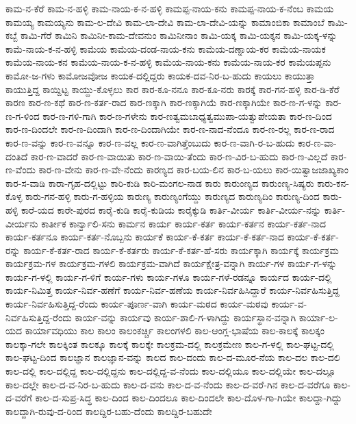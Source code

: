 ಕಾಮ-ನ-ಕೆರೆ
ಕಾಮ-ನ-ಹಳ್ಳಿ
ಕಾಮ-ನಾಯ-ಕ-ನ-ಹಳ್ಳಿ
ಕಾಮಪ್ಪ-ನಾಯ-ಕನು
ಕಾಮಪ್ಪ-ನಾಯ-ಕ-ನೆಂಬ
ಕಾಮಯ
ಕಾಮಯ್ಯ
ಕಾಮಯ್ಯನು
ಕಾಮ-ಲ-ದೇವಿ
ಕಾಮ-ಲಾ-ದೇವಿ
ಕಾಮ-ಲಾ-ದೇವಿ-ಯನ್ನು
ಕಾಮಾಂಬಿಕಾ
ಕಾಮಾಂಬೆ
ಕಾಮಿ-ಕಬ್ಬೆ
ಕಾಮಿ-ಗೆರೆ
ಕಾಮಿನಿ
ಕಾಮಿನೀ-ಕಾಮ-ದೇವನುಂ
ಕಾಮಿನೀನಾಂ
ಕಾಮಿ-ಯಕ್ಕ
ಕಾಮಿ-ಯಕ್ಕನ
ಕಾಮಿ-ಯಕ್ಕ-ಳನ್ನು
ಕಾಮೆ-ನಾಯ-ಕ-ನ-ಹಳ್ಳಿ
ಕಾಮೆಯ
ಕಾಮೆಯ-ದಂಡ-ನಾಯ-ಕನು
ಕಾಮೆಯ-ದಣ್ನಾಯ-ಕರ
ಕಾಮೆಯ-ನಾಯಕ
ಕಾಮೆಯ-ನಾಯ-ಕನ
ಕಾಮೆಯ-ನಾಯ-ಕ-ನ-ಹಳ್ಳಿ
ಕಾಮೆಯ-ನಾಯ-ಕನು
ಕಾಮೆಯ-ನಾಯ-ಕರ
ಕಾಮೆಯಪ್ಪನು
ಕಾಮೋ-ಜ-ಗಳು
ಕಾಮೋಜವೋಜ
ಕಾಯಕ-ದಲ್ಲಿದ್ದರು
ಕಾಯಕ-ದವ-ನಿರ-ಬ-ಹುದು
ಕಾಯಲು
ಕಾಯುತ್ತಾ
ಕಾಯುತ್ತಿದ್ದ
ಕಾಯ್ದಿಟ್ಟ
ಕಾಯ್ದು-ಕೊಳ್ಳಲು
ಕಾರ
ಕಾರ-ಕೂ-ನನೂ
ಕಾರ-ಕೂ-ನರು
ಕಾರಕ್ಕೆ
ಕಾರ-ಗನ-ಹಳ್ಳಿ
ಕಾರ-ಡಿ-ಕೆರೆ
ಕಾರಣ
ಕಾರ-ಣ-ಕಥೆ
ಕಾರ-ಣ-ಕರ್ತ-ರಾದ
ಕಾರ-ಣಕ್ಕಾಗಿ
ಕಾರ-ಣಕ್ಕಾಗಿಯೆ
ಕಾರ-ಣಕ್ಕಾಗಿಯೇ
ಕಾರ-ಣ-ಗ-ಳನ್ನು
ಕಾರ-ಣ-ಗ-ಳಿಂದ
ಕಾರ-ಣ-ಗಳಿ-ಗಾಗಿ
ಕಾರ-ಣ-ಗಳೇನು
ಕಾರ-ಣತ್ವಮಬಾಧ್ಯತ್ವಮುಪಾ-ಯತ್ವುಪೇಯತಾ
ಕಾರ-ಣ-ದಿಂದ
ಕಾರ-ಣ-ದಿಂದಲೇ
ಕಾರ-ಣ-ದಿಂದಾಗಿ
ಕಾರ-ಣ-ದಿಂದಾಗಿಯೇ
ಕಾರ-ಣ-ನಾದ-ನೆಂದೂ
ಕಾರ-ಣ-ರಲ್ಲ
ಕಾರ-ಣ-ರಾದ
ಕಾರ-ಣ-ವನ್ನು
ಕಾರ-ಣ-ವನ್ನೂ
ಕಾರ-ಣ-ವಲ್ಲ
ಕಾರ-ಣ-ವಾಗಿತ್ತೆಂಬುದು
ಕಾರ-ಣ-ವಾಗಿ-ರ-ಬ-ಹುದು
ಕಾರ-ಣ-ವಾ-ದಂತಿದೆ
ಕಾರ-ಣ-ವಾದರೆ
ಕಾರ-ಣ-ವಾಯಿತು
ಕಾರ-ಣ-ವಾಯಿ-ತೆಂದು
ಕಾರ-ಣ-ವಿರ-ಬ-ಹುದು
ಕಾರ-ಣ-ವಿಲ್ಲದೆ
ಕಾರ-ಣ-ವೆಂದು
ಕಾರ-ಣ-ವೇನು
ಕಾರ-ಣ-ವೇ-ನೆಂದು
ಕಾರಣ್ಯದ
ಕಾರ-ಬಯ-ಲಿನ
ಕಾರ-ಬ-ಯಲು
ಕಾರ-ಯಿತ್ವಾಜಜಾಖ್ಯಕಾಂ
ಕಾರ-ಸ-ವಾಡಿ
ಕಾರಾ-ಗೃಹ-ದಲ್ಲಿಟ್ಟು
ಕಾರಿ-ಕುಡಿ
ಕಾರಿ-ಮಂಗಲ-ನಾಡ
ಕಾರು
ಕಾರುಂಣ್ಯದ
ಕಾರುಂಣ್ಯ-ಸಿಷ್ಯರು
ಕಾರು-ಕನ-ಕೊಳ್ಳ
ಕಾರು-ಗನ-ಹಳ್ಳಿ
ಕಾರು-ಗ-ಹಳ್ಳಿಯ
ಕಾರುಣ್ಯ
ಕಾರುಣ್ಯಂಗೆಯ್ದು
ಕಾರುಣ್ಯದ
ಕಾರುಣ್ಯದಿಂ
ಕಾರುಣ್ಯ-ದಿಂದ
ಕಾರು-ಹಳ್ಳಿ
ಕಾರೆ-ಯದ
ಕಾರೇ-ಪುರದ
ಕಾರೈ-ಕುಡಿ
ಕಾರೈ-ಕುಡಿಯ
ಕಾರೈಕ್ಕುಡಿ
ಕಾರ್ತಿ-ವೀರ್ಯ
ಕಾರ್ತಿ-ವೀರ್ಯ-ನನ್ನು
ಕಾರ್ತಿ-ವೀರ್ಯನು
ಕಾರ್ತೀಕ
ಕಾರ್ನ್ವಾಲಿ-ಸನು
ಕಾರ್ಮನ
ಕಾರ್ಯ
ಕಾರ್ಯ-ಕರ್ತ
ಕಾರ್ಯ-ಕರ್ತನ
ಕಾರ್ಯ-ಕರ್ತ-ನಾದ
ಕಾರ್ಯ-ಕರ್ತನೂ
ಕಾರ್ಯ-ಕರ್ತ-ನೊಬ್ಬನು
ಕಾರ್ಯಕೆ
ಕಾರ್ಯ-ಕೆ-ಕರ್ತ
ಕಾರ್ಯ-ಕೆ-ಕರ್ತ-ನಾದ
ಕಾರ್ಯ-ಕೆ-ಕರ್ತ-ರನ್ನು
ಕಾರ್ಯ-ಕೆ-ಕರ್ತ-ರಾದ
ಕಾರ್ಯ-ಕೆ-ಕರ್ತರು
ಕಾರ್ಯ-ಕೆ-ಕರ್ತ-ಹೆ-ಸರು
ಕಾರ್ಯಕ್ಕಾಗಿ
ಕಾರ್ಯಕ್ಕೆ
ಕಾರ್ಯಕ್ರಮ
ಕಾರ್ಯಕ್ರಮ-ಗಳ
ಕಾರ್ಯಕ್ರಮ-ಗಳಲಿ
ಕಾರ್ಯಕ್ರಮ-ವಾಗಿದೆ
ಕಾರ್ಯಕ್ಷೇತ್ರ-ವನ್ನಾಗಿ
ಕಾರ್ಯ-ಗಳ
ಕಾರ್ಯ-ಗ-ಳನ್ನು
ಕಾರ್ಯ-ಗ-ಳಲ್ಲಿ
ಕಾರ್ಯ-ಗ-ಳಿಗೆ
ಕಾರ್ಯ-ಗಳು
ಕಾರ್ಯ-ಗಳೂ
ಕಾರ್ಯ-ಗಳೆ-ರಡನ್ನೂ
ಕಾರ್ಯದ
ಕಾರ್ಯ-ದಲ್ಲಿ
ಕಾರ್ಯ-ನಿಮಿತ್ತ
ಕಾರ್ಯ-ನಿರ್ವ-ಹಣೆಗೆ
ಕಾರ್ಯ-ನಿರ್ವ-ಹಣೆಯ
ಕಾರ್ಯ-ನಿರ್ವಹಿಸಿದ್ದಾರೆ
ಕಾರ್ಯ-ನಿರ್ವಹಿಸುತ್ತಿದ್ದ
ಕಾರ್ಯ-ನಿರ್ವಹಿಸುತ್ತಿದ್ದ-ರೆಂದು
ಕಾರ್ಯ-ಪೂರ್ಣ-ವಾಗಿ
ಕಾರ್ಯ-ಮಠದ
ಕಾರ್ಯ-ಮಠವು
ಕಾರ್ಯ-ವ-ನಿರ್ವಹಿಸುತ್ತಿದ್ದ-ರೆಂದು
ಕಾರ್ಯ-ವನ್ನು
ಕಾರ್ಯವು
ಕಾರ್ಯ-ಶಾಲಿ-ಗ-ಳಾಗಿದ್ದು
ಕಾರ್ಯಸ್ಥಾನ-ವನ್ನಾಗಿ
ಕಾರ್ಯಾ-ಲ-ಯದ
ಕಾರ್ಯಾವಧಿಯು
ಕಾಲ
ಕಾಲಂ
ಕಾಲಂಕರ್ಚ್ಚಿ
ಕಾಲಂಗಳಲಿ
ಕಾಲ-ಆಂಗ್ಲ-ಭಾಷೆಯ
ಕಾಲ-ಕಾಲಕ್ಕೆ
ಕಾಲಕ್ಕಂ
ಕಾಲಕ್ಕಾ-ಗಲೇ
ಕಾಲಕ್ಕಿಂತ
ಕಾಲಕ್ಕೂ
ಕಾಲಕ್ಕೆ
ಕಾಲಕ್ಕೇ
ಕಾಲಕ್ರಮ-ದಲ್ಲಿ
ಕಾಲಕ್ರಮೇಣ
ಕಾಲ-ಗ-ಳಲ್ಲಿ
ಕಾಲ-ಘಟ್ಟ-ದಲ್ಲಿ
ಕಾಲ-ಘಟ್ಟ-ದಿಂದ
ಕಾಲಜ್ಞಾನ
ಕಾಲಜ್ಞಾನ-ವನ್ನು
ಕಾಲದ
ಕಾಲ-ದಂದು
ಕಾಲ-ದ-ಮೂರ-ನೆಯ
ಕಾಲ-ದಲ
ಕಾಲ-ದಲಿ
ಕಾಲ-ದಲ್ಲಿ
ಕಾಲ-ದಲ್ಲಿದ್ದ
ಕಾಲ-ದಲ್ಲಿದ್ದನು
ಕಾಲ-ದಲ್ಲಿದ್ದ-ವ-ನೆಂದು
ಕಾಲ-ದಲ್ಲಿಯೂ
ಕಾಲ-ದಲ್ಲಿಯೇ
ಕಾಲ-ದಲ್ಲೂ
ಕಾಲ-ದಲ್ಲೇ
ಕಾಲ-ದ-ವ-ನಿರ-ಬ-ಹುದು
ಕಾಲ-ದ-ವನು
ಕಾಲ-ದ-ವ-ನೆಂದು
ಕಾಲ-ದ-ವರೆ-ಗಿನ
ಕಾಲ-ದ-ವರೆಗೂ
ಕಾಲ-ದ-ವರೆಗೆ
ಕಾಲ-ದ-ಸುಪ್ರ-ಸಿದ್ಧ
ಕಾಲ-ದಿಂದ
ಕಾಲ-ದಿಂದಲೂ
ಕಾಲ-ದಿಂದಲೇ
ಕಾಲ-ದೊಳ-ಗಾ-ಗಿಯೇ
ಕಾಲದ್ದಾ-ಗಿದ್ದು
ಕಾಲದ್ದಾಗಿ-ರುವು-ದ-ರಿಂದ
ಕಾಲದ್ದಿರ-ಬಹು-ದೆಂದು
ಕಾಲದ್ದಿರ-ಬಹುದೇ
